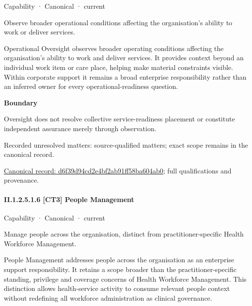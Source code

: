 \label{element:d6f39d94cd2e4bf2ab91ff58ba604ab0}
{\small Capability · Canonical · current}\par

Observe broader operational conditions affecting the organisation’s ability to work or deliver services.



Operational Oversight observes broader operating conditions affecting the organisation's ability to work and deliver services. It provides context beyond an individual work item or care place, helping make material constraints visible. Within corporate support it remains a broad enterprise responsibility rather than an inferred owner for every operational-readiness question.



\textbf{Boundary}



Oversight does not resolve collective service-readiness placement or constitute independent assurance merely through observation.


{\small Recorded unresolved matters: source-qualified matters; exact scope remains in the canonical record.}\par
{\footnotesize \href{../../../../continuum/strategy/capability/d6f39d94cd2e4bf2ab91ff58ba604ab0.md}{Canonical record: d6f39d94cd2e4bf2ab91ff58ba604ab0}; full qualifications and provenance.}\par
\paragraph*{II.1.2.5.1.6 [CT3] People Management}
\label{navigation:II.1.2.5.1.6}

\label{element:df8b9d309b354efcb15991b3d75ed852}
{\small Capability · Canonical · current}\par

Manage people across the organisation, distinct from practitioner-specific Health Workforce Management.



People Management addresses people across the organisation as an enterprise support responsibility. It retains a scope broader than the practitioner-specific standing, privilege and coverage concerns of Health Workforce Management. This distinction allows health-service activity to consume relevant people context without redefining all workforce administration as clinical governance.



